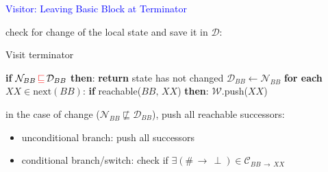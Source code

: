 \begin{frame}[fragile]{\textcolor{blue}{Visitor: Leaving Basic Block at Terminator}}

{\color{blue}check for change} of the local state and save it in $\mathcal{D}$:
\begin{algorithm}[H]
\caption{Visit terminator}
\begin{algorithmic}[1]
\State \textbf{if} $\mathcal{N}_{BB} \,{\color{red}\sqsubseteq}\, \mathcal{D}_{BB}$ \textbf{then}:
\State \qquad \textbf{return}
\Comment state has not changed
\State $\mathcal{D}_{BB} \gets \mathcal{N}_{BB}$
\State \textbf{for each} $XX \in \text{next}(BB)$:
\State \qquad\textbf{if} reachable($BB,\,XX$) \textbf{then}:
\State \qquad\qquad $\mathcal{W}$.push($XX$)
\EndProcedure
\end{algorithmic}
\end{algorithm}
in the case of change ($\mathcal{N}_{BB} \not\sqsubseteq \mathcal{D}_{BB}$), {\color{blue}push all reachable successors}:
\begin{itemize}
\item unconditional branch: push all successors
\item {\color{blue}conditional branch/switch}: check if $\exists (\#\,\rightarrow\,\perp)\in \mathcal{C}_{BB \,\rightarrow\, XX}$
\end{itemize}
\end{frame}


